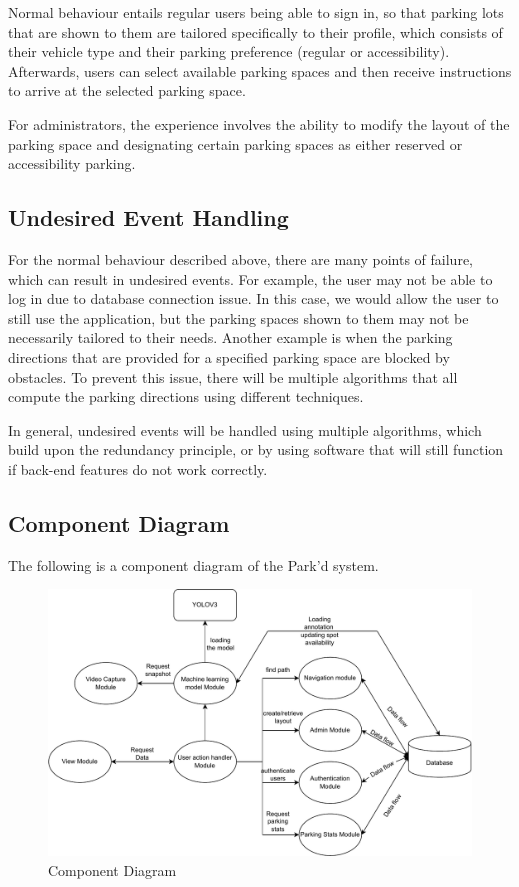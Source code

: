 \documentclass[12pt, titlepage]{article}
\begin{document}
Normal behaviour entails regular users being able to sign in, so that parking
lots that are shown to them are tailored specifically to their profile, which
consists of their vehicle type and their parking preference (regular or
accessibility). Afterwards, users can select available parking spaces and then
receive instructions to arrive at the selected parking space. 

For administrators, the experience involves the ability to modify the layout of
the parking space and designating certain parking spaces as either reserved or
accessibility parking.

\subsection{Undesired Event Handling}

For the normal behaviour described above, there are many points of failure,
which can result in undesired events. For example, the user may not be able to
log in due to database connection issue. In this case, we would allow the user
to still use the application, but the parking spaces shown to them may not be
necessarily tailored to their needs. Another example is when the parking
directions that are provided for a specified parking space are blocked by
obstacles. To prevent this issue, there will be multiple algorithms that all
compute the parking directions using different techniques.

In general, undesired events will be handled using multiple algorithms, which
build upon the redundancy principle, or by using software that will still
function if back-end features do not work correctly.


\newpage
\color{red}
\subsection{Component Diagram}
The following is a component diagram of the Park'd system.

\begin{figure}[H]
\begin{center}
    \includegraphics[scale=0.75]{component_diagram.pdf}
    \caption{Component Diagram}
\end{center}
\end{figure}
\end{document}
